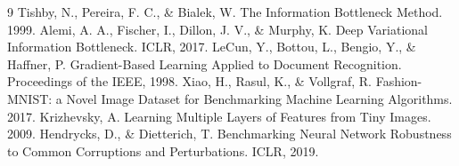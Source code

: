 \documentclass[11pt,a4paper]{article}
\begin{document}
\begin{thebibliography}{9}
 Tishby, N., Pereira, F. C., \& Bialek, W. The Information Bottleneck Method. 1999.
 Alemi, A. A., Fischer, I., Dillon, J. V., \& Murphy, K. Deep Variational Information Bottleneck. ICLR, 2017.
 LeCun, Y., Bottou, L., Bengio, Y., \& Haffner, P. Gradient-Based Learning Applied to Document Recognition. Proceedings of the IEEE, 1998.
 Xiao, H., Rasul, K., \& Vollgraf, R. Fashion-MNIST: a Novel Image Dataset for Benchmarking Machine Learning Algorithms. 2017.
 Krizhevsky, A. Learning Multiple Layers of Features from Tiny Images. 2009.
 Hendrycks, D., \& Dietterich, T. Benchmarking Neural Network Robustness to Common Corruptions and Perturbations. ICLR, 2019.
\end{thebibliography}
\end{document}
